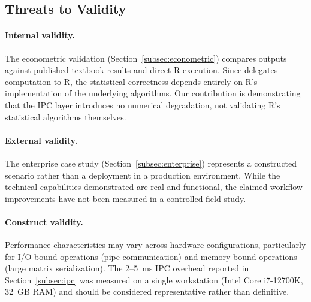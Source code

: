 \subsection{Threats to Validity}

\paragraph{Internal validity.} The econometric validation (Section~\ref{subsec:econometric}) compares \neven{} outputs against published textbook results and direct R execution. Since \neven{} delegates computation to R, the statistical correctness depends entirely on R's implementation of the underlying algorithms. Our contribution is demonstrating that the IPC layer introduces no numerical degradation, not validating R's statistical algorithms themselves.

\paragraph{External validity.} The enterprise case study (Section~\ref{subsec:enterprise}) represents a constructed scenario rather than a deployment in a production environment. While the technical capabilities demonstrated are real and functional, the claimed workflow improvements have not been measured in a controlled field study.

\paragraph{Construct validity.} Performance characteristics may vary across hardware configurations, particularly for I/O-bound operations (pipe communication) and memory-bound operations (large matrix serialization). The 2--5~ms IPC overhead reported in Section~\ref{subsec:ipc} was measured on a single workstation (Intel Core i7-12700K, 32~GB RAM) and should be considered representative rather than definitive.
